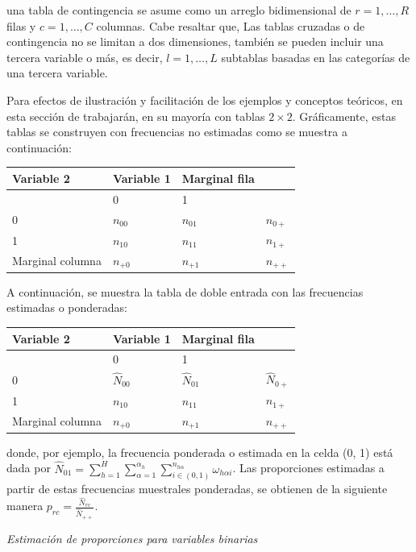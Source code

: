 \documentclass[
  12pt,
]{book}
\begin{document}
una tabla de contingencia se asume como un arreglo bidimensional de \(r=1,\ldots,R\) filas y \(c=1,\ldots,C\) columnas. Cabe resaltar que, Las tablas cruzadas o de contingencia no se limitan a dos dimensiones, también se pueden incluir una tercera variable o más, es decir, \(l=1,\ldots,L\) subtablas basadas en las categorías de una tercera variable.

Para efectos de ilustración y facilitación de los ejemplos y conceptos teóricos, en esta sección de trabajarán, en su mayoría con tablas \(2\times2\). Gráficamente, estas tablas se construyen con frecuencias no estimadas como se muestra a continuación:

\begin{longtable}[]{@{}llll@{}}
\toprule()
Variable 2 & Variable 1 & Marginal fila & \\
\midrule()
\endhead
& 0 & 1 & \\
0 & \(n_{00}\) & \(n_{01}\) & \(n_{0+}\) \\
1 & \(n_{10}\) & \(n_{11}\) & \(n_{1+}\) \\
Marginal columna & \(n_{+0}\) & \(n_{+1}\) & \(n_{++}\) \\
\bottomrule()
\end{longtable}

A continuación, se muestra la tabla de doble entrada con las frecuencias estimadas o ponderadas:

\begin{longtable}[]{@{}llll@{}}
\toprule()
Variable 2 & Variable 1 & Marginal fila & \\
\midrule()
\endhead
& 0 & 1 & \\
0 & \(\hat{N}_{00}\) & \(\hat{N}_{01}\) & \(\hat{N}_{0+}\) \\
1 & \(n_{10}\) & \(n_{11}\) & \(n_{1+}\) \\
Marginal columna & \(n_{+0}\) & \(n_{+1}\) & \(n_{++}\) \\
\bottomrule()
\end{longtable}

donde, por ejemplo, la frecuencia ponderada o estimada en la celda (0, 1) está dada por \(\hat{N}_{01}={\displaystyle \sum_{h=1}^{H}\sum_{\alpha=1}^{\alpha_{h}}\sum_{i\in\left(0,1\right)}^{n_{h\alpha}}}\omega_{h\alpha i}\). Las proporciones estimadas a partir de estas frecuencias muestrales ponderadas, se obtienen de la siguiente manera \(p_{rc}=\frac{\hat{N}_{rc}}{\hat{N}_{++}}\).

\emph{Estimación de proporciones para variables binarias}
\end{document}

